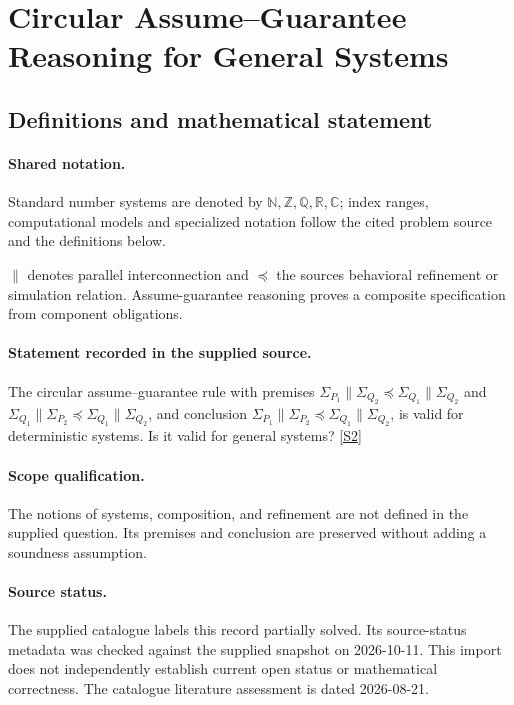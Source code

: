 \documentclass[11pt]{article}
\newcommand{\sref}[2]{\hyperlink{source:#1:#2}{[S#2]}}
\begin{document}
\section{Circular Assume–Guarantee Reasoning for General Systems}\label{statement}

\subsection{Definitions and mathematical statement}

\paragraph{Shared notation.}Standard number systems are denoted by $\mathbb N,\mathbb Z,\mathbb Q,\mathbb R,\mathbb C$; index ranges, computational models and specialized notation follow the cited problem source and the definitions below.


$\parallel$ denotes parallel interconnection and $\preccurlyeq$ the source\textquotesingle s behavioral refinement or simulation relation. Assume-guarantee reasoning proves a composite specification from component obligations.
\paragraph{Statement recorded in the supplied source.}
The circular assume–guarantee rule with premises $\Sigma_{P_1}\parallel\Sigma_{Q_2}\preccurlyeq\Sigma_{Q_1}\parallel\Sigma_{Q_2}$ and $\Sigma_{Q_1}\parallel\Sigma_{P_2}\preccurlyeq\Sigma_{Q_1}\parallel\Sigma_{Q_2}$, and conclusion $\Sigma_{P_1}\parallel\Sigma_{P_2}\preccurlyeq\Sigma_{Q_1}\parallel\Sigma_{Q_2}$, is valid for deterministic systems. Is it valid for general systems? \sref{statement}{2}
\paragraph{Scope qualification.}
The notions of systems, composition, and refinement are not defined in the supplied question. Its premises and conclusion are preserved without adding a soundness assumption.
\paragraph{Source status.}
The supplied catalogue labels this record partially solved. Its source-status metadata was checked against the supplied snapshot on 2026-10-11. This import does not independently establish current open status or mathematical correctness. The catalogue literature assessment is dated 2026-08-21.
\end{document}
